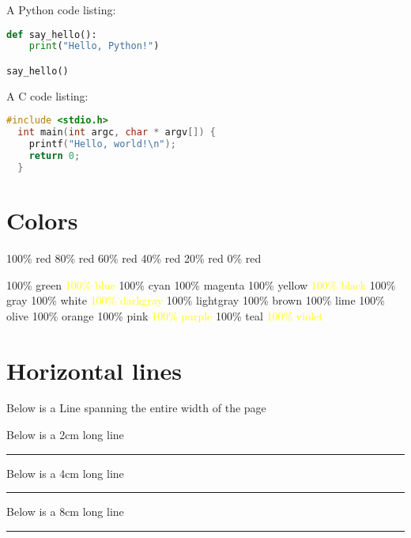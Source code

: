 \documentclass[12pt, letterpaper, oneside]{article}
\begin{document}
A Python code listing:

\begin{lstlisting}[language=Python]
def say_hello():
    print("Hello, Python!")

say_hello()
\end{lstlisting}

A C code listing:

\begin{lstlisting}[language=C]
  #include <stdio.h>
  int main(int argc, char * argv[]) {
    printf("Hello, world!\n");
    return 0;
  }
\end{lstlisting}

\section{Colors}

\colorbox{red!100}{100\% red}
\colorbox{red!80}{80\% red}
\colorbox{red!60}{60\% red}
\colorbox{red!40}{40\% red}
\colorbox{red!20}{20\% red}
\colorbox{red!0}{0\% red}

\colorbox{green!100}{100\% green}
\colorbox{blue!100}{\textcolor{yellow}{100\% blue}}
\colorbox{cyan!100}{100\% cyan}
\colorbox{magenta!100}{100\% magenta}
\colorbox{yellow!100}{100\% yellow}
\colorbox{black!100}{\textcolor{yellow}{100\% black}}
\colorbox{gray!100}{100\% gray}
\colorbox{white!100}{100\% white}
\colorbox{darkgray!100}{\textcolor{yellow}{100\% darkgray}}
\colorbox{lightgray!100}{100\% lightgray}
\colorbox{brown!100}{100\% brown}
\colorbox{lime!100}{100\% lime}
\colorbox{olive!100}{100\% olive}
\colorbox{orange!100}{100\% orange}
\colorbox{pink!100}{100\% pink}
\colorbox{purple!100}{\textcolor{yellow}{100\% purple}}
\colorbox{teal!100}{100\% teal}
\colorbox{violet!100}{\textcolor{yellow}{100\% violet}}

\section{Horizontal lines}

Below is a Line spanning the entire width of the page

\noindent\makebox[\linewidth]{\rule{\paperwidth}{0.4pt}}

Below is a 2cm long line

\noindent\rule{2cm}{0.4pt}

Below is a 4cm long line

\noindent\rule{4cm}{0.4pt}

Below is a 8cm long line

\noindent\rule{8cm}{0.4pt}
\end{document}

